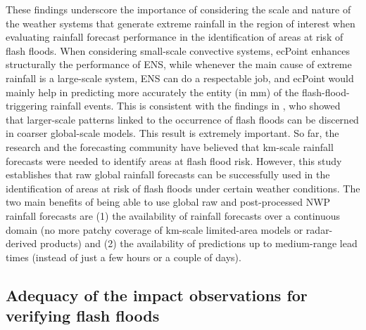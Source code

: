 \documentclass[techmemo]{ecmwfrep}%
\begin{document}
These findings underscore the importance of considering the scale and nature of the weather systems that generate extreme rainfall in the region of interest when evaluating rainfall forecast performance in the identification of areas at risk of flash floods. When considering small-scale convective systems, ecPoint enhances structurally the performance of ENS, while whenever the main cause of extreme rainfall is a large-scale system, ENS can do a respectable job, and ecPoint would mainly help in predicting more accurately the entity (in mm) of the flash-flood-triggering rainfall events. This is consistent with the findings in \cite{Bucherie2022b}, who showed that larger-scale patterns linked to the occurrence of flash floods can be discerned in coarser global-scale models. This result is extremely important. So far, the research and the forecasting community have believed that km-scale rainfall forecasts were needed to identify areas at flash flood risk. However, this study establishes that raw global rainfall forecasts can be successfully used in the identification of areas at risk of flash floods under certain weather conditions. The two main benefits of being able to use global raw and post-processed NWP rainfall forecasts are (1) the availability of rainfall forecasts over a continuous domain (no more patchy coverage of km-scale limited-area models or radar-derived products) and (2) the availability of predictions up to medium-range lead times (instead of just a few hours or a couple of days). 

\subsection{Adequacy of the impact observations for verifying flash floods}
\end{document}
